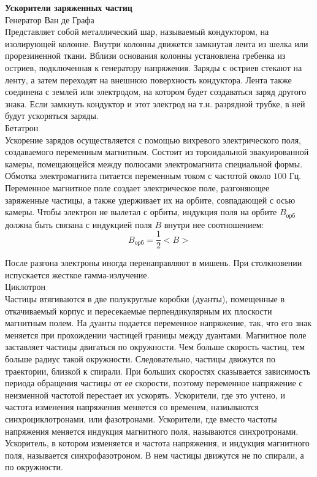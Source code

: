 \documentclass{article}
\begin{document}
	
	\textbf{Ускорители заряженных частиц}\\

	Генератор Ван де Графа\\

	Представляет собой металлический шар, называемый кондуктором, на изолирующей колонне. Внутри колонны движется замкнутая лента из шелка или прорезиненной ткани. Вблизи основания колонны установлена гребенка из остриев, подключенная к генератору напряжения. Заряды с остриев стекают на ленту, а затем переходят на внешнюю поверхность кондуктора. Лента также соединена с землей или электродом, на котором будет создаваться заряд другого знака. Если замкнуть кондуктор и этот электрод на т.н. разрядной трубке, в ней будут ускоряться заряды.\\

	Бетатрон\\

	Ускорение зарядов осуществляется с помощью вихревого электрического поля, создаваемого переменным магнитным. Состоит из тороидальной эвакуированной камеры, помещающейся между полюсами электромагнита специальной формы. Обмотка электромагнита питается переменным током с частотой около $100$ Гц. Переменное магнитное поле создает электрическое поле, разгоняющее заряженные частицы, а также удерживает их на орбите, совпадающей с осью камеры. Чтобы электрон не вылетал с орбиты, индукция поля на орбите $B_\text{орб}$ должна быть связана с индукцией поля $B$ внутри нее соотношением:
	\begin{equation}
		B_\text{орб} = \frac{1}{2}<B>
	\end{equation}

	После разгона электроны иногда перенаправляют в мишень. При столкновении испускается жесткое гамма-излучение.\\

	Циклотрон\\

	Частицы втягиваются в две полукруглые коробки (дуанты), помещенные в откачиваемый корпус и пересекаемые перпендикулярным их плоскости магнитным полем. На дуанты подается переменное напряжение, так, что его знак меняется при прохождении частицей границы между дуантами. Магнитное поле заставляет частицы двигаться по окружности. Чем больше скорость частиц, тем больше радиус такой окружности. Следовательно, частицы движутся по траектории, близкой к спирали. При больших скоростях сказывается зависимость периода обращения частицы от ее скорости, поэтому переменное напряжение с неизменной частотой перестает их ускорять. Ускорители, где это учтено, и частота изменения напряжения меняется со временем, назиываются синхроциклотронами, или фазотронами. Ускорители, где вместо частоты напряжения меняется индукция магнитного поля, называются синхротронами. Ускоритель, в котором изменяется и частота напряжения, и индукция магнитного поля, называется синхрофазотроном. В нем частицы движутся не по спирали, а по окружности.
\end{document}
